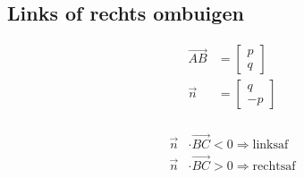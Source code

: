 \documentclass[a4paper, twocolumn]{article}
\renewcommand{\vec}{\overrightarrow}
\begin{document}
\subsection*{Links of rechts ombuigen}\vspace{-0.5em}
\begin{minipage}{0.45\linewidth}
\end{minipage}
\begin{minipage}{0.25\linewidth}
	\begin{align*}
	\vec{AB} &= \begin{bmatrix} p \\ q \end{bmatrix} \\
	\vec{n} &= \begin{bmatrix} q \\ -p \end{bmatrix} \\
	\end{align*}
\end{minipage}%
\begin{minipage}{0.25\linewidth}
	\begin{align*}
	\vec{n} &\cdot \vec{BC} < 0 \Rightarrow \text{linksaf} \\
	\vec{n} &\cdot \vec{BC} > 0 \Rightarrow \text{rechtsaf}
	\end{align*}
\end{minipage}
\end{document}
